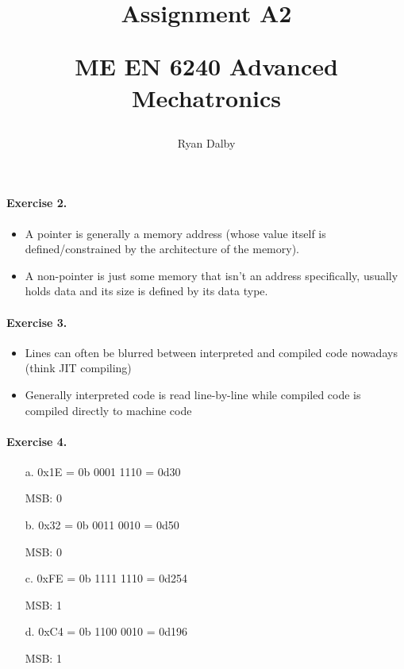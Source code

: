 \documentclass[12pt]{article}
\title{
    Assignment A2

    \large{
        ME EN 6240 Advanced Mechatronics
    }  
}
\author{
        Ryan Dalby
}
\date{\displaydate{date}}
\begin{document}
\maketitle

\paragraph{Exercise 2.}

\begin{itemize}
    \item 
    A pointer is generally a memory address (whose value itself is defined/constrained by the architecture of the memory).

    \item 
    A non-pointer is just some memory that isn't an address specifically, usually holds data and its size is defined by its data type.
\end{itemize}

\paragraph{Exercise 3.}

\begin{itemize}
    \item 
    Lines can often be blurred between interpreted and compiled code nowadays (think JIT compiling)

    \item 
    Generally interpreted code is read line-by-line while compiled code is compiled directly to machine code
\end{itemize}

\paragraph{Exercise 4.}

\begin{itemize}
    \item [a.]
    0x1E = 0b 0001 1110 = 0d30

    MSB: 0

    \item [b.]
    0x32 = 0b 0011 0010 = 0d50

    MSB: 0

    \item [c.]
    0xFE = 0b 1111 1110 = 0d254

    MSB: 1

    \item [d.]
    0xC4 = 0b 1100 0010 = 0d196

    MSB: 1
\end{itemize}
\end{document}
